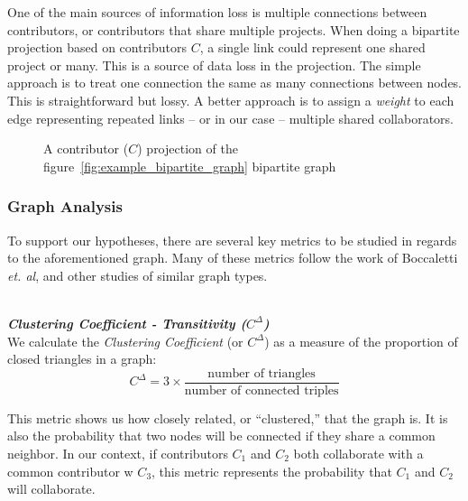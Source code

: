 \documentclass{proc}
\begin{document}
One of the main sources of information loss is multiple connections between contributors, or contributors that share multiple projects. When doing a bipartite projection based on contributors $C$, a single link could represent one shared project or many. This is a source of data loss in the projection. The simple approach is to treat one connection the same as many connections between nodes. This is straightforward but lossy\cite{zhou2007bipartite,grossman1995portion}. A better approach is to assign a \textit{weight} to each edge representing repeated links -- or in our case -- multiple shared collaborators\cite{zha2001bipartite,barrat2004architecture}.

\begin{figure}
\centering
{}
\caption{A contributor ($C$) projection of the figure~\ref{fig:example_bipartite_graph} bipartite graph}
\label{fig:example_bipartite_projection_graph}
\end{figure}

\subsubsection{Graph Analysis}
To support our hypotheses, there are several key metrics to be studied in regards to the aforementioned graph. Many of these metrics follow the work of Boccaletti \textit{et. al}\cite{boccaletti2006complex}, and other studies of similar graph types\cite{latora2001efficient,adamic1999small}.

\noindent\\\textit{\textbf{Clustering Coefficient - Transitivity ($C^\Delta$)}}\\
We calculate the \textit{Clustering Coefficient} (or $C^\Delta$) as a measure of the proportion of closed triangles in a graph\cite{newman2003structure}:
\[C^\Delta = 3 \times \frac{\text{number of triangles}}
                    {\text{number of connected triples}}\]

This metric shows us how closely related, or ``clustered,'' that the graph is. It is also the probability that two nodes will be connected if they share a common neighbor\cite{newman2003properties}. In our context, if contributors $C_1$ and $C_2$ both collaborate with a common contributor w $C_3$, this metric represents the probability that $C_1$ and $C_2$ will collaborate.
\end{document}

